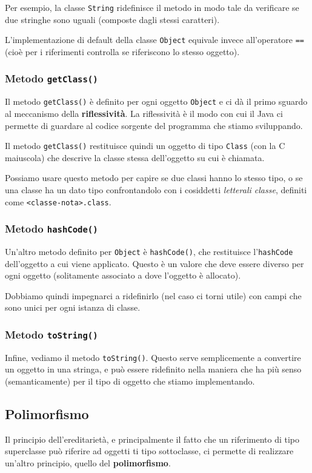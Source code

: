 \documentclass[a4paper,11pt]{article}
\begin{document}
Per esempio, la classe \lstinline|String| ridefinisce il metodo in modo tale da verificare se due stringhe sono uguali (composte dagli stessi caratteri).

L'implementazione di default della classe \lstinline|Object| equivale invece all'operatore \lstinline|==| (cioè per i riferimenti controlla se riferiscono lo stesso oggetto).

\subsubsection{Metodo \lstinline|getClass()|}
Il metodo \lstinline|getClass()| è definito per ogni oggetto \lstinline|Object| e ci dà il primo sguardo al meccanismo della \textbf{riflessività}.
La riflessività è il modo con cui il Java ci permette di guardare al codice sorgente del programma che stiamo sviluppando.

Il metodo \lstinline|getClass()| restituisce quindi un oggetto di tipo \lstinline|Class| (con la C maiuscola) che descrive la classe stessa dell'oggetto su cui è chiamata.

Possiamo usare questo metodo per capire se due classi hanno lo stesso tipo, o se una classe ha un dato tipo confrontandolo con i cosiddetti \textit{letterali classe}, definiti come \lstinline|<classe-nota>.class|.

\subsubsection{Metodo \lstinline|hashCode()|}
Un'altro metodo definito per \lstinline|Object| è \lstinline|hashCode()|, che restituisce l'\lstinline|hashCode| dell'oggetto a cui viene applicato.
Questo è un valore che deve essere diverso per ogni oggetto (solitamente associato a dove l'oggetto è allocato).

Dobbiamo quindi impegnarci a ridefinirlo (nel caso ci torni utile) con campi che sono unici per ogni istanza di classe.

\subsubsection{Metodo \lstinline|toString()|}
Infine, vediamo il metodo \lstinline|toString()|. Questo serve semplicemente a convertire un oggetto in una stringa, e può essere ridefinito nella maniera che ha più senso (semanticamente) per il tipo di oggetto che stiamo implementando.

\subsection{Polimorfismo}
Il principio dell'ereditarietà, e principalmente il fatto che un riferimento
di tipo superclasse può riferire ad oggetti ti tipo sottoclasse, ci permette di realizzare un'altro principio, quello del \textbf{polimorfismo}.
\end{document}
